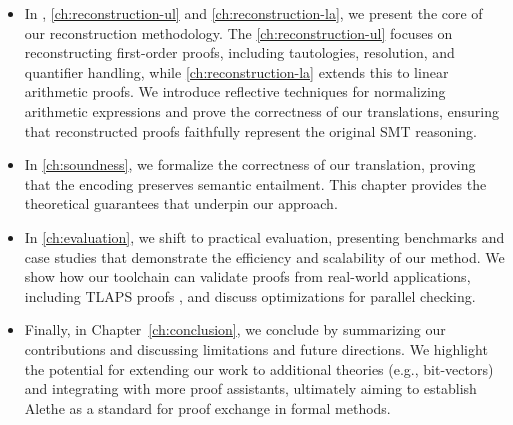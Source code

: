 \begin{itemize}
\item In , \ref{ch:reconstruction-ul} and \ref{ch:reconstruction-la}, we present the core of our reconstruction methodology.
    The \cref{ch:reconstruction-ul} focuses on reconstructing first-order proofs, including tautologies, resolution, and quantifier handling, while \cref{ch:reconstruction-la} extends this to linear arithmetic proofs.
    We introduce reflective techniques for normalizing arithmetic expressions and prove the correctness of our translations, ensuring that reconstructed proofs faithfully represent the original SMT reasoning.

\item In \cref{ch:soundness}, we formalize the correctness of our translation, proving that the encoding preserves semantic entailment.
    This chapter provides the theoretical guarantees that underpin our approach.

\item In \cref{ch:evaluation}, we shift to practical evaluation, presenting benchmarks and case studies that demonstrate the efficiency and scalability of our method.
    We show how our toolchain can validate proofs from real-world applications, including TLAPS proofs \cite{tla-proofs}, and discuss optimizations for parallel checking.

\item Finally, in Chapter~\cref{ch:conclusion}, we conclude by summarizing our contributions and discussing limitations and future directions.
    We highlight the potential for extending our work to additional theories (e.g., bit-vectors) and integrating with more proof assistants, ultimately aiming to establish Alethe as a standard for proof exchange in formal methods.
\end{itemize}
